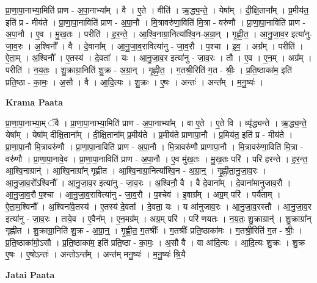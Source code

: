 \documentclass[17pt]{extarticle}
\begin{document}
प्रा॒णा॒पा॒नाभ्या॒मिति॑ प्राण - अ॒पा॒नाभ्या᳚म् । वै । ए॒ते । वीति॑ । ऋ॒द्ध्य॒न्ते॒ । येषा᳚म् । दी॒क्षि॒ताना᳚म् । प्र॒मीय॑त॒ इति॑ प्र - मीय॑ते । प्रा॒णा॒पा॒नाविति॑ प्राण - अ॒पा॒नौ । मि॒त्रावरु॑णा॒विति॑ मि॒त्रा - वरु॑णौ । प्रा॒णा॒पा॒नाविति॑ प्राण - अ॒पा॒नौ । ए॒व । मु॒ख॒तः । परीति॑ । ह॒र॒न्ते॒ । आ॒श्वि॒नाग्रा॒नित्या᳚श्वि॒न-अ॒ग्रा॒न् । गृ॒ह्णी॒त॒ । आ॒नु॒जा॒व॒र इत्या॑नु-जा॒व॒रः । अ॒श्विनौ᳚ । वै । दे॒वाना᳚म् । आ॒नु॒जा॒व॒रावित्या॑नु - जा॒व॒रौ । प॒श्चा । इ॒व॒ । अग्र᳚म् । परीति॑ । ऐ॒ता॒म् । अ॒श्विनौ᳚ । ए॒तस्य॑ । दे॒वता᳚ । यः । आ॒नु॒जा॒व॒र इत्या॑नु - जा॒व॒रः । तौ । ए॒व । ए॒न॒म् । अग्र᳚म् । परीति॑ । न॒य॒तः॒ । शु॒क्राग्रा॒निति॑ शु॒क्र - अ॒ग्रा॒न् । गृ॒ह्णी॒त॒ । ग॒तश्री॒रिति॑ ग॒त - श्रीः॒ । प्र॒ति॒ष्ठाका॑म॒ इति॑ प्रति॒ष्ठा - का॒मः॒ । अ॒सौ । वै । आ॒दि॒त्यः । शु॒क्रः । ए॒षः । अन्तः॑ । अन्त᳚म् । म॒नु॒ष्यः॑ ।  \newline


\textbf{Krama Paata} \newline

प्रा॒णा॒पा॒नाभ्या॒म् ॅवै । प्रा॒णा॒पा॒नाभ्या॒मिति॑ प्राण - अ॒पा॒नाभ्या᳚म् । वा ए॒ते । ए॒ते वि । व्यृ॑द्ध्यन्ते । ऋ॒द्ध्य॒न्ते॒ येषा᳚म् । येषा᳚म् दीक्षि॒ताना᳚म् । दी॒क्षि॒ताना᳚म् प्र॒मीय॑ते । प्र॒मीय॑ते प्राणापा॒नौ । प्र॒मिय॑त॒ इति॑ प्र - मीय॑ते । प्रा॒णा॒पा॒नौ मि॒त्रावरु॑णौ । प्रा॒णा॒पा॒नाविति॑ प्राण - अ॒पा॒नौ । मि॒त्रावरु॑णौ प्राणापा॒नौ । मि॒त्रावरु॑णा॒विति॑ मि॒त्रा - वरु॑णौ । प्रा॒णा॒पा॒नावे॒व । प्रा॒णा॒पा॒नाविति॑ प्राण - अ॒पा॒नौ । ए॒व मु॑ख॒तः । मु॒ख॒तः परि॑ । परि॑ हरन्ते । ह॒र॒न्त॒ आ॒श्वि॒नाग्रान्॑ । आ॒श्वि॒नाग्रा᳚न् गृह्णीत । आ॒श्वि॒नाग्रा॒नित्या᳚श्वि॒न - अ॒ग्रा॒न्॒ । गृ॒ह्णी॒ता॒नु॒जा॒व॒रः । आ॒नु॒जा॒व॒रो᳚ऽश्विनौ᳚ । आ॒नु॒जा॒व॒र इत्या॑नु - जा॒व॒रः । अ॒श्विनौ॒ वै । वै दे॒वाना᳚म् । दे॒वाना॑मानुजाव॒रौ । आ॒नु॒जा॒व॒रौ प॒श्चा । आ॒नु॒जा॒व॒रावित्या॑नु - जा॒व॒रौ । प॒श्चेव॑ । इ॒वाग्र᳚म् । अग्र॒म् परि॑ । पर्यै॑ताम् । ऐ॒ता॒म॒श्विनौ᳚ । अ॒श्विना॑वे॒तस्य॑ । ए॒तस्य॑ दे॒वता᳚ । दे॒वता॒ यः । य आ॑नुजाव॒रः । आ॒नु॒जा॒व॒रस्तौ । आ॒नु॒जा॒व॒र इत्या॑नु - जा॒व॒रः । तावे॒व । ए॒वैन᳚म् । ए॒न॒मग्र᳚म् । अग्र॒म् परि॑ । परि॑ णयतः । न॒य॒तः॒ शु॒क्राग्रान्॑ । शु॒क्राग्रा᳚न् गृह्णीत । शु॒क्राग्रा॒निति॑ शु॒क्र - अ॒ग्रा॒न्॒ । गृ॒ह्णी॒त॒ ग॒तश्रीः᳚ । ग॒तश्रीः᳚ प्रति॒ष्ठाका॑मः । ग॒तश्री॒रिति॑ ग॒त - श्रीः॒ । प्र॒ति॒ष्ठाका॑मो॒ऽसौ । प्र॒ति॒ष्ठाका॑म॒ इति॑ प्रति॒ष्ठा - का॒मः॒ । अ॒सौ वै । वा आ॑दि॒त्यः । आ॒दि॒त्यः शु॒क्रः । शु॒क्र ए॒षः । ए॒षोऽन्तः॑ । अन्तोऽन्त᳚म् । अन्त॑म् मनु॒ष्यः॑ । म॒नु॒ष्यः॑ श्रि॒यै \newline

\textbf{Jatai Paata} \newline
\end{document}
